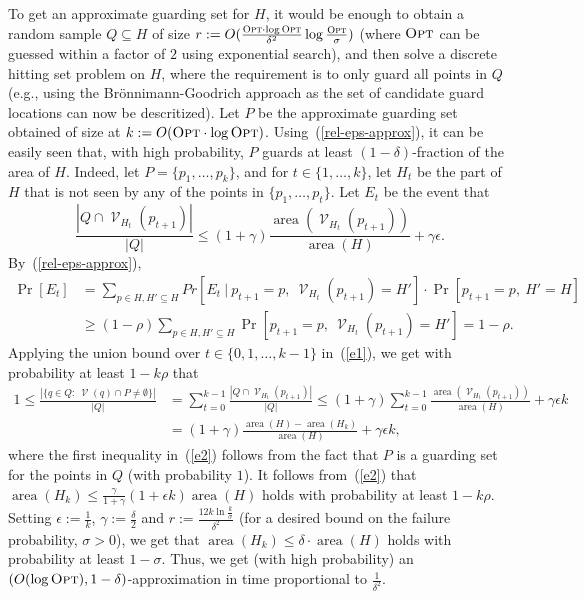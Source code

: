 \documentclass[a4paper,11pt]{article}
\def\cV{\mathcal V}
\newcommand{\raf}[1]{(\ref{#1})}
\newcommand{\area}{\operatorname{area}}
\newcommand{\Vis}{\operatorname{\cV}}
\def \OPT {\textsc{Opt}}
\begin{document}
To get an approximate guarding set for $H$, it would be enough to obtain a random sample $Q\subseteq H$ of size $r:=O(\frac{\OPT\cdot\log\OPT}{\delta^2}\log\frac{\OPT}{\sigma})$ (where $\OPT$ can be guessed within a factor of $2$ using exponential search), and then solve a discrete hitting set problem on $H$, where the requirement is to only guard all points in $Q$ (e.g., using the Br\"{o}nnimann-Goodrich approach \cite{BG95} as the set of candidate guard locations can now be descritized). Let $P$ be the approximate guarding set obtained of size at $k:=O(\OPT\cdot\log \OPT)$. Using~\raf{rel-eps-approx}, it can be easily seen that, with high probability, $P$ guards at least $(1-\delta)$-fraction of the area of $H$. Indeed, let $P=\{p_1,\ldots,p_k\}$, and for $t\in\{1,\ldots,k\}$, let $H_t$ be the part of $H$ that is not seen by any of the points in $\{p_1,\ldots,p_{t}\}.$ 
Let $E_t$ be the event that 
$$\frac{|Q \cap \Vis_{H_t}(p_{t+1})|}{|Q|}\le (1+\gamma)\frac{\area(\Vis_{H_t}(p_{t+1}))}{\area(H)}+\gamma\epsilon.$$
By~\raf{rel-eps-approx},
\begin{align}\label{e1}
\Pr[E_t]&=\sum_{p\in H,H'\subseteq H}Pr[E_t~|~p_{t+1}=p,~\Vis_{H_t}(p_{t+1})=H']\cdot\Pr[p_{t+1}=p,~H'=H]\\
&\ge(1-\rho)\sum_{p\in H,H'\subseteq H}\Pr[p_{t+1}=p,~\Vis_{H_t}(p_{t+1})=H']=1-\rho.
\end{align}
Applying the union bound over $t\in\{0,1,\ldots,k-1\}$ in~\raf{e1}, we get with probability at least $1-k\rho$ that
\begin{align}\label{e2}
1\le\frac{|\{q\in Q:~\Vis(q)\cap P\ne\emptyset\}|}{|Q|}&=\sum_{t=0}^{k-1}\frac{|Q \cap \Vis_{H_t}(p_{t+1})|}{|Q|}\le (1+\gamma)\sum_{t=0}^{k-1}\frac{\area( \Vis_{H_t}(p_{t+1}))}{\area(H)}+\gamma\epsilon k\nonumber\\
&=(1+\gamma)\frac{\area(H)-\area(H_k)}{\area(H)}+\gamma\epsilon k,
\end{align}
where the first inequality in~\raf{e2} follows from the fact that $P$ is a guarding set for the points in $Q$ (with probability $1$). It follows from~\raf{e2} that $\area(H_k)\le\frac{\gamma}{1+\gamma}(1+\epsilon k)\area(H)$ holds with probability at least $1-k\rho$.  Setting $\epsilon:=\frac1k$, $\gamma:=\frac\delta2$ and $r:=\frac{12 k \ln \frac{k}{\sigma}}{\delta^2}$ (for a desired bound on the failure probability, $\sigma>0$), we get that $\area(H_k)\le\delta\cdot \area(H)$ holds with probability at least $1-\sigma$. Thus, we get (with high probability) an $(O(\log\OPT),1-\delta)$-approximation in time proportional to $\frac1{\delta^2}$.
\end{document}
